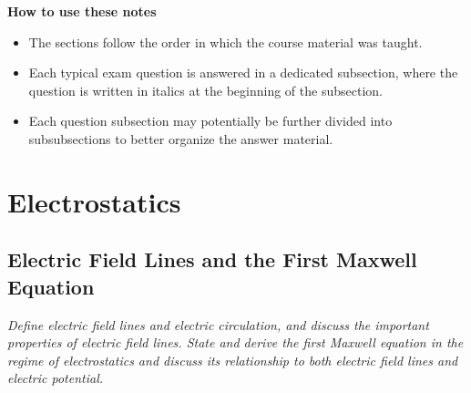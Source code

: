 \documentclass[11pt, a4paper]{article}
\begin{document}
\vspace{5mm}
\textbf{How to use these notes}
\begin{itemize}
    \item The sections follow the order in which the course material was taught.

    \item Each typical exam question is answered in a dedicated subsection, where the question is written in italics at the beginning of the subsection.
    
    \item Each question subsection may potentially be further divided into subsubsections to better organize the answer material.

\end{itemize}


\newpage

\pagestyle{empty}  %

\tableofcontents

\newpage

\pagestyle{fancy}  %

\section{Electrostatics}

\subsection{Electric Field Lines and the First Maxwell Equation}
\textit{Define electric field lines and electric circulation, and discuss the important properties of electric field lines. State and derive the first Maxwell equation in the regime of electrostatics and discuss its relationship to both electric field lines and electric potential.}
    
\end{document}
